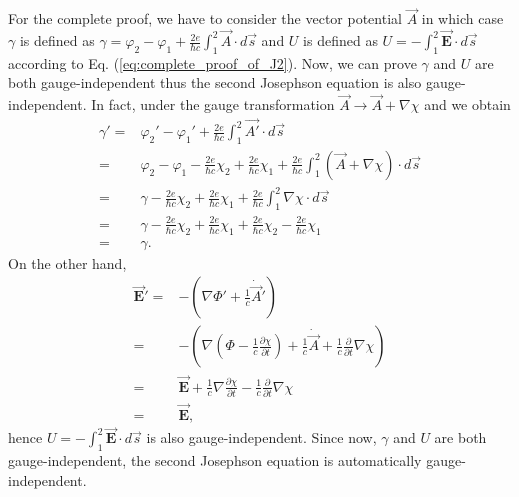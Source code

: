 For the complete proof, we have to consider the vector potential $\overrightarrow{A}$
in which case $\gamma$ is defined as $\gamma=\varphi_{2}-\varphi_{1}+\frac{2e}{\hbar c}\int_{1}^{2}\overrightarrow{A}\cdot d\overrightarrow{s}$
and $U$ is defined as $U=-\int_{1}^{2}\overrightarrow{\bm{E}}\cdot d\overrightarrow{s}$
according to Eq. (\ref{eq:complete_proof_of_J2}). Now, we can prove
$\gamma$ and $U$ are both gauge-independent thus the second Josephson
equation is also gauge-independent. In fact, under the gauge transformation
$\overrightarrow{A}\to\overrightarrow{A}+\nabla\chi$ and we obtain
\begin{equation}
\begin{split}\gamma'= & \varphi_{2}'-\varphi_{1}'+\frac{2e}{\hbar c}\int_{1}^{2}\overrightarrow{A'}\cdot d\overrightarrow{s}\\
= & \varphi_{2}-\varphi_{1}-\frac{2e}{\hbar c}\chi_{2}+\frac{2e}{\hbar c}\chi_{1}+\frac{2e}{\hbar c}\int_{1}^{2}(\overrightarrow{A}+\nabla\chi)\cdot d\overrightarrow{s}\\
= & \gamma-\frac{2e}{\hbar c}\chi_{2}+\frac{2e}{\hbar c}\chi_{1}+\frac{2e}{\hbar c}\int_{1}^{2}\nabla\chi\cdot d\overrightarrow{s}\\
= & \gamma-\frac{2e}{\hbar c}\chi_{2}+\frac{2e}{\hbar c}\chi_{1}+\frac{2e}{\hbar c}\chi_{2}-\frac{2e}{\hbar c}\chi_{1}\\
= & \gamma.
\end{split}
\end{equation}
On the other hand, 
\begin{equation}
\begin{split}\overrightarrow{\bm{E}}'= & -(\nabla\Phi'+\frac{1}{c}\dot{\overrightarrow{A}}')\\
= & -\left(\nabla(\Phi-\frac{1}{c}\frac{\partial\chi}{\partial t})+\frac{1}{c}\dot{\overrightarrow{A}}+\frac{1}{c}\frac{\partial}{\partial t}\nabla\chi\right)\\
= & \overrightarrow{\bm{E}}+\frac{1}{c}\nabla\frac{\partial\chi}{\partial t}-\frac{1}{c}\frac{\partial}{\partial t}\nabla\chi\\
= & \overrightarrow{\bm{E}},
\end{split}
\end{equation}
hence $U=-\int_{1}^{2}\overrightarrow{\bm{E}}\cdot d\overrightarrow{s}$
is also gauge-independent. Since now, $\gamma$ and $U$ are both
gauge-independent, the second Josephson equation is automatically
gauge-independent. 
